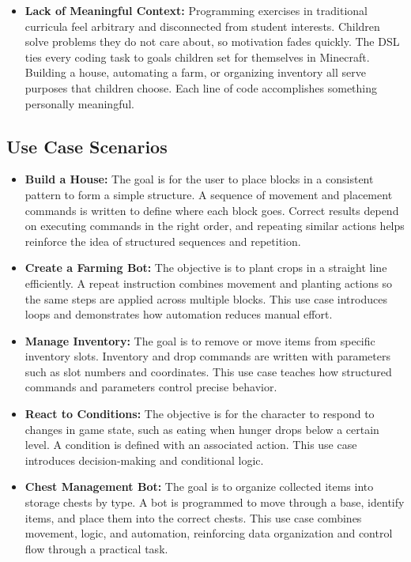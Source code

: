 \begin{itemize}
    \item[\textbf{--}] \textbf{Lack of Meaningful Context:} 
    Programming exercises in traditional curricula feel arbitrary and disconnected from student interests. 
    Children solve problems they do not care about, so motivation fades quickly. 
    The DSL ties every coding task to goals children set for themselves in Minecraft. 
    Building a house, automating a farm, or organizing inventory all serve purposes that children choose. 
    Each line of code accomplishes something personally meaningful.
\end{itemize}

\subsection{Use Case Scenarios}

\begin{itemize}
    \item[\textbf{--}] \textbf{Build a House:}
    The goal is for the user to place blocks in a consistent pattern to form a simple structure. 
    A sequence of movement and placement commands is written to define where each block goes. 
    Correct results depend on executing commands in the right order, and repeating similar actions helps reinforce the idea of structured sequences and repetition.

    \item[\textbf{--}] \textbf{Create a Farming Bot:}
    The objective is to plant crops in a straight line efficiently. 
    A repeat instruction combines movement and planting actions so the same steps are applied across multiple blocks. 
    This use case introduces loops and demonstrates how automation reduces manual effort.

    \item[\textbf{--}] \textbf{Manage Inventory:}
    The goal is to remove or move items from specific inventory slots. 
    Inventory and drop commands are written with parameters such as slot numbers and coordinates. 
    This use case teaches how structured commands and parameters control precise behavior.

    \item[\textbf{--}] \textbf{React to Conditions:}
    The objective is for the character to respond to changes in game state, such as eating when hunger drops below a certain level. 
    A condition is defined with an associated action. 
    This use case introduces decision-making and conditional logic.

    \item[\textbf{--}] \textbf{Chest Management Bot:}
    The goal is to organize collected items into storage chests by type. 
    A bot is programmed to move through a base, identify items, and place them into the correct chests. 
    This use case combines movement, logic, and automation, reinforcing data organization and control flow through a practical task.
\end{itemize}